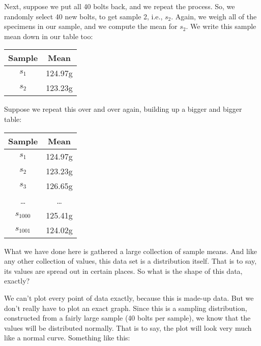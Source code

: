 \documentclass[../../../main.tex]{subfiles}
\begin{document}
\noindent
Next, suppose we put all 40 bolts back, and we repeat the process. So, we randomly select 40 new bolts, to get sample 2, i.e., $s_{2}$. Again, we weigh all of the specimens in our sample, and we compute the mean for $s_{2}$. We write this sample mean down in our table too:

\begin{center}
  \begin{tabular}{| c | c |}
    \hline
    \textbf{Sample} & \textbf{Mean} \\ \hline
    $s_{1}$ & 124.97g \\ \hline
    $s_{2}$ & 123.23g \\ \hline
  \end{tabular}
\end{center}

\noindent
Suppose we repeat this over and over again, building up a bigger and bigger table:

\begin{center}
  \begin{tabular}{| c | c |}
    \hline
    \textbf{Sample} & \textbf{Mean} \\ \hline
    $s_{1}$ & 124.97g \\ \hline
    $s_{2}$ & 123.23g \\ \hline
    $s_{3}$ & 126.65g \\ \hline
    \ldots & \ldots \\ \hline
    $s_{1000}$ & 125.41g \\ \hline
    $s_{1001}$ & 124.02g \\ \hline
  \end{tabular}
\end{center}

\noindent
What we have done here is gathered a large collection of sample means. And like any other collection of values, this data set is a distribution itself. That is to say, its values are spread out in certain places. So what is the shape of this data, exactly?

We can't plot every point of data exactly, because this is made-up data. But we don't really have to plot an exact graph. Since this is a sampling distribution, constructed from a fairly large sample (40 bolts per sample), we know that the values will be distributed normally. That is to say, the plot will look very much like a normal curve. Something like this:

\begin{center}
\end{center}
\end{document}
